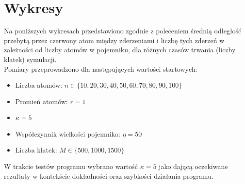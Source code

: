 \documentclass{article}
\begin{document}
\section{Wykresy}
Na poniższych wykresach przedstawiono zgodnie z poleceniem średnią odległość przebytą przez czerwony atom między zderzeniami i liczbę tych zderzeń w zależności od liczby atomów w pojemniku, dla różnych czasów trwania (liczby klatek) symulacji.\\
Pomiary przeprowadzono dla następujących wartości startowych:
\begin{itemize}
    \item Liczba atomów: $n\in\{10,20, 30, 40, 50, 60, 70, 80, 90, 100\}$
    \item Promień atomów: $r=1$
    \item $\kappa=5$
    \item Współczynnik wielkości pojemnika: $\eta=50$
    \item Liczba klatek: $M \in \{500, 1000, 1500\}$
\end{itemize}
W trakcie testów programu wybrano wartość $\kappa=5$ jako dającą oczekiwane rezultaty w kontekście dokładności oraz szybkości działania programu.\\
\end{document}
